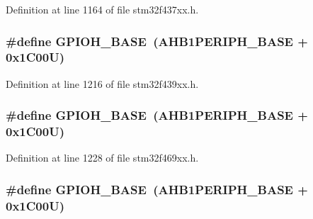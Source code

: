 Definition at line 1164 of file stm32f437xx.\+h.

\subsubsection[{\texorpdfstring{G\+P\+I\+O\+H\+\_\+\+B\+A\+SE}{GPIOH_BASE}}]{\setlength{\rightskip}{0pt plus 5cm}\#define G\+P\+I\+O\+H\+\_\+\+B\+A\+SE~({\bf A\+H\+B1\+P\+E\+R\+I\+P\+H\+\_\+\+B\+A\+SE} + 0x1\+C00\+U)}\hypertarget{group___peripheral__memory__map_gaee4716389f3a1c727495375b76645608}{}\label{group___peripheral__memory__map_gaee4716389f3a1c727495375b76645608}


Definition at line 1216 of file stm32f439xx.\+h.

\subsubsection[{\texorpdfstring{G\+P\+I\+O\+H\+\_\+\+B\+A\+SE}{GPIOH_BASE}}]{\setlength{\rightskip}{0pt plus 5cm}\#define G\+P\+I\+O\+H\+\_\+\+B\+A\+SE~({\bf A\+H\+B1\+P\+E\+R\+I\+P\+H\+\_\+\+B\+A\+SE} + 0x1\+C00\+U)}\hypertarget{group___peripheral__memory__map_gaee4716389f3a1c727495375b76645608}{}\label{group___peripheral__memory__map_gaee4716389f3a1c727495375b76645608}


Definition at line 1228 of file stm32f469xx.\+h.

\subsubsection[{\texorpdfstring{G\+P\+I\+O\+H\+\_\+\+B\+A\+SE}{GPIOH_BASE}}]{\setlength{\rightskip}{0pt plus 5cm}\#define G\+P\+I\+O\+H\+\_\+\+B\+A\+SE~({\bf A\+H\+B1\+P\+E\+R\+I\+P\+H\+\_\+\+B\+A\+SE} + 0x1\+C00\+U)}\hypertarget{group___peripheral__memory__map_gaee4716389f3a1c727495375b76645608}{}\label{group___peripheral__memory__map_gaee4716389f3a1c727495375b76645608}


